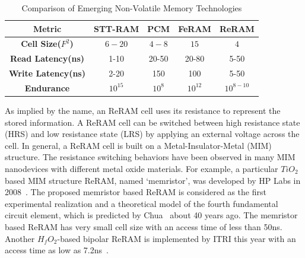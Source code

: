 \begin{table}[!tb]
  \centering
  \scriptsize
    \scriptsize
  \caption{Comparison of Emerging Non-Volatile Memory Technologies}\label{table:compare}
  \vspace{-5pt}
  \begin{tabular}{|c|cccc|}
    \hline
    \textbf{Metric} & \textbf{STT-RAM} & \textbf{PCM}    & \textbf{FeRAM} & \textbf{ReRAM}
    \\\hline
    \textbf{Cell Size($F^2$)} & $6-20$ & $4-8$ & $15$ & $4$\\\hline
    \textbf{Read Latency(ns)} &  1-10 & 20-50 & 20-80 & 5-50\\\hline
    \textbf{Write Latency(ns)} & 2-20& 150& 100& 5-50\\\hline
    \textbf{Endurance} &  $10^{15}$ & $10^8$ & $10^{12}$ & $10^{8-10}$\\\hline
  \end{tabular}
  \vspace{-10pt}
\end{table}


As implied by the name, an ReRAM cell uses its resistance to represent the stored information. A ReRAM cell can be switched between high resistance state (HRS) and low resistance state (LRS) by applying an external voltage across the cell. 
In general, a ReRAM cell is built on a Metal-Insulator-Metal (MIM) structure. The resistance switching behaviors have been observed in many MIM nanodevices with different metal oxide materials. For example, a particular $TiO_2$ based MIM structure ReRAM, named `memristor', was developed by HP Labs in 2008~\cite{memristor:missing}. The proposed memristor based ReRAM is considered as the first experimental realization and a theoretical model of the fourth fundamental circuit element, which is predicted by Chua~\cite{memristor:chua} about 40 years ago. The memristor based ReRAM has very small cell size with an access time of less than 50ns. %
Another $H_fO_2$-based bipolar ReRAM is implemented by ITRI this year with an access time as low as 7.2ns~\cite{ReRAM_ISSCC2011_Sheu}.

